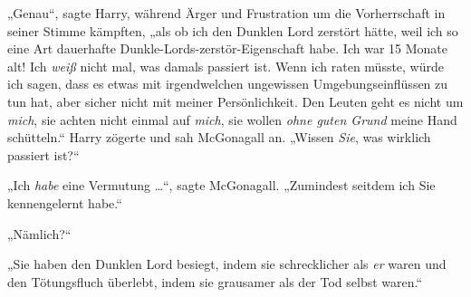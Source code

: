 „Genau“, sagte Harry, während Ärger und Frustration um die Vorherrschaft in seiner Stimme kämpften, „als ob ich den Dunklen Lord zerstört hätte, weil ich so eine Art dauerhafte Dunkle-Lords-zerstör-Eigenschaft habe. Ich war 15 Monate alt! Ich \emph{weiß} nicht mal, was damals passiert ist. Wenn ich raten müsste, würde ich sagen, dass es etwas mit irgendwelchen ungewissen Umgebungseinflüssen zu tun hat, aber sicher nicht mit meiner Persönlichkeit. Den Leuten geht es nicht um \emph{mich}, sie achten nicht einmal auf \emph{mich}, sie wollen \emph{ohne guten Grund} meine Hand schütteln.“ Harry zögerte und sah McGonagall an.
„Wissen \emph{Sie}, was wirklich passiert ist?“

„Ich \emph{habe} eine Vermutung …“, sagte McGonagall.
„Zumindest seitdem ich Sie kennengelernt habe.“

„Nämlich?“

„Sie haben den Dunklen Lord besiegt, indem sie schrecklicher als \emph{er} waren und den Tötungsfluch überlebt, indem sie grausamer als der Tod selbst waren.“

